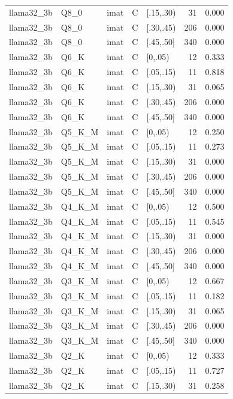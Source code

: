 \begin{tabular}{lllllrr}
llama32\_3b & Q8\_0 & imat & C & [.15,.30) & 31 & 0.000 \\
llama32\_3b & Q8\_0 & imat & C & [.30,.45) & 206 & 0.000 \\
llama32\_3b & Q8\_0 & imat & C & [.45,.50] & 340 & 0.000 \\
llama32\_3b & Q6\_K & imat & C & [0,.05) & 12 & 0.333 \\
llama32\_3b & Q6\_K & imat & C & [.05,.15) & 11 & 0.818 \\
llama32\_3b & Q6\_K & imat & C & [.15,.30) & 31 & 0.065 \\
llama32\_3b & Q6\_K & imat & C & [.30,.45) & 206 & 0.000 \\
llama32\_3b & Q6\_K & imat & C & [.45,.50] & 340 & 0.000 \\
llama32\_3b & Q5\_K\_M & imat & C & [0,.05) & 12 & 0.250 \\
llama32\_3b & Q5\_K\_M & imat & C & [.05,.15) & 11 & 0.273 \\
llama32\_3b & Q5\_K\_M & imat & C & [.15,.30) & 31 & 0.000 \\
llama32\_3b & Q5\_K\_M & imat & C & [.30,.45) & 206 & 0.000 \\
llama32\_3b & Q5\_K\_M & imat & C & [.45,.50] & 340 & 0.000 \\
llama32\_3b & Q4\_K\_M & imat & C & [0,.05) & 12 & 0.500 \\
llama32\_3b & Q4\_K\_M & imat & C & [.05,.15) & 11 & 0.545 \\
llama32\_3b & Q4\_K\_M & imat & C & [.15,.30) & 31 & 0.000 \\
llama32\_3b & Q4\_K\_M & imat & C & [.30,.45) & 206 & 0.000 \\
llama32\_3b & Q4\_K\_M & imat & C & [.45,.50] & 340 & 0.000 \\
llama32\_3b & Q3\_K\_M & imat & C & [0,.05) & 12 & 0.667 \\
llama32\_3b & Q3\_K\_M & imat & C & [.05,.15) & 11 & 0.182 \\
llama32\_3b & Q3\_K\_M & imat & C & [.15,.30) & 31 & 0.065 \\
llama32\_3b & Q3\_K\_M & imat & C & [.30,.45) & 206 & 0.000 \\
llama32\_3b & Q3\_K\_M & imat & C & [.45,.50] & 340 & 0.000 \\
llama32\_3b & Q2\_K & imat & C & [0,.05) & 12 & 0.333 \\
llama32\_3b & Q2\_K & imat & C & [.05,.15) & 11 & 0.727 \\
llama32\_3b & Q2\_K & imat & C & [.15,.30) & 31 & 0.258 \\

\end{tabular}
